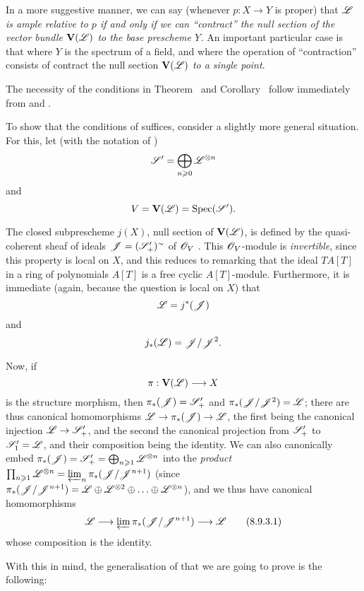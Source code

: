 In a more suggestive manner, we can say (whenever $p:X\to Y$ is proper) that \emph{$\mathscr{L}$ is ample relative to $p$ if and only if we can ``\emph{contract}'' the null section of the vector bundle $\mathbf{V}(\mathscr{L})$ to the base prescheme $Y$.}
An important particular case is that where $Y$ is the spectrum of a field, and where the operation of ``contraction'' consists of contract the null section $\mathbf{V}(\mathscr{L})$ \emph{to a single point}.

\begin{env}[8.9.3]
\label{II.8.9.3}
The necessity of the conditions in Theorem~ and Corollary~ follow immediately from  and .

To show that the conditions of  suffices, consider a slightly more general situation.
For this, let (with the notation of )
\[
  \mathscr{S}' = \bigoplus_{n\geqslant0}\mathscr{L}^{\otimes n}
\]
and
\[
  V = \mathbf{V}(\mathscr{L}) = \operatorname{Spec}(\mathscr{S}').
\]

The closed subprescheme $j(X)$, null section of $\mathbf{V}(\mathscr{L})$, is defined by the quasi-coherent sheaf of ideals $\mathscr{J}=(\mathscr{S}'_+)^\sim$ of $\mathscr{O}_V$ .
This $\mathscr{O}_V$-module is \emph{invertible}, since this property is local on $X$, and this reduces to remarking that the ideal $TA[T]$ in a ring of polynomials $A[T]$ is a free cyclic $A[T]$-module.
Furthermore, it is immediate (again, because the question is local on $X$) that
\[
  \mathscr{L} = j^*(\mathscr{J})
\]
and
\[
  j_*(\mathscr{L}) = \mathscr{J}/\mathscr{J}^2.
\]

Now, if
\[
  \pi : \bb{V}(\sh{L}) \to X
\]
is the structure morphism, then $\pi_*(\mathscr{J})=\mathscr{S}'_+$ and $\pi_*(\mathscr{J}/\mathscr{J}^2)=\mathscr{L}$;
there are thus canonical homomorphisms $\sh{L}\to\pi_*(\sh{J})\to\sh{L}$, the first being the canonical injection $\sh{L}\to\sh{S}'_+$, and the second the canonical projection from $\mathscr{S}'_+$ to $\mathscr{S}'_1=\mathscr{L}$, and their composition being the identity.
We can also canonically embed $\pi_*(\mathscr{J}) = \mathscr{S}'_+ = \bigoplus_{n\geqslant1}\mathscr{L}^{\otimes n}$ into the \emph{product} $\prod_{n\geqslant1}\mathscr{L}^{\otimes n} = \varprojlim_n \pi_*(\mathscr{J}/\mathscr{J}^{n+1})$ (since $\pi_*(\mathscr{J}/\mathscr{J}^{n+1}) = \mathscr{L}\oplus\mathscr{L}^{\otimes 2}\oplus\ldots\oplus\mathscr{L}^{\otimes n}$), and we thus have canonical homomorphisms
\[
\label{II.8.9.3.1}
  \sh{L} \to \varprojlim \pi_*(\sh{J}/\sh{J}^{n+1}) \to \sh{L}
\tag{8.9.3.1}
\]
whose composition is the identity.

With this in mind, the generalisation of  that we are going to prove is the following:
\end{env}

